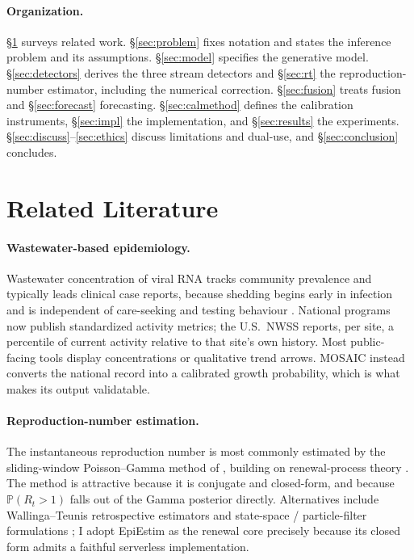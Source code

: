 \documentclass[10pt,twocolumn]{article}
\theoremstyle{definition}
\newcommand{\Rt}{R_t}
\newcommand{\Prob}{\mathbb{P}}
\begin{document}
\paragraph{Organization.}
\S\ref{sec:related} surveys related work. \S\ref{sec:problem} fixes notation and
states the inference problem and its assumptions. \S\ref{sec:model} specifies the
generative model. \S\ref{sec:detectors} derives the three stream detectors and
\S\ref{sec:rt} the reproduction-number estimator, including the numerical
correction. \S\ref{sec:fusion} treats fusion and \S\ref{sec:forecast}
forecasting. \S\ref{sec:calmethod} defines the calibration instruments,
\S\ref{sec:impl} the implementation, and \S\ref{sec:results} the experiments.
\S\ref{sec:discuss}--\ref{sec:ethics} discuss limitations and dual-use, and
\S\ref{sec:conclusion} concludes.

\section{Related Literature}
\label{sec:related}

\paragraph{Wastewater-based epidemiology.}
Wastewater concentration of viral RNA tracks community prevalence and typically
leads clinical case reports, because shedding begins early in infection and is
independent of care-seeking and testing behaviour
\citep{nwss,naughton2023}. National programs now publish standardized activity
metrics; the U.S.\ NWSS reports, per site, a percentile of current activity
relative to that site's own history. Most public-facing tools display
concentrations or qualitative trend arrows. MOSAIC instead converts the national
record into a calibrated growth probability, which is what makes its
output validatable.

\paragraph{Reproduction-number estimation.}
The instantaneous reproduction number is most commonly estimated by the
sliding-window Poisson--Gamma method of \citet{cori2013}, building on
renewal-process theory \citep{wallinga2004,fraser2007}. The method is attractive
because it is conjugate and closed-form, and because $\Prob(\Rt>1)$ falls out of
the Gamma posterior directly. Alternatives include Wallinga--Teunis
retrospective estimators and state-space / particle-filter formulations
\citep{flaxman2020}; I adopt EpiEstim as the renewal core precisely because its
closed form admits a faithful serverless implementation.
\end{document}

